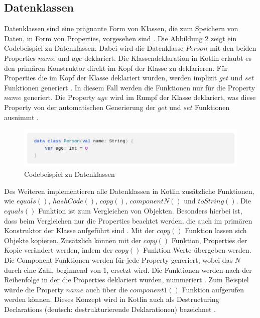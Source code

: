 \documentclass{article}
\begin{document}
\subsection{Datenklassen}
Datenklassen sind eine prägnante Form von Klassen, die zum Speichern von Daten, in Form von Properties, vorgesehen sind \cite{KotlinLangDoc}. Die Abbildung 2 zeigt ein Codebeispiel zu Datenklassen. Dabei wird die Datenklasse $Person$ mit den beiden Properties $name$ und $age$ deklariert. Die Klassendeklaration in Kotlin erlaubt es den primären Konstruktor direkt im Kopf der Klasse zu deklarieren. Für Properties die im Kopf der Klasse deklariert wurden, werden implizit $get$ und $set$ Funktionen generiert \cite{KotlinLangDoc}. In diesem Fall werden die Funktionen nur für die Property $name$ generiert. Die Property $age$ wird im Rumpf der Klasse deklariert, was diese Property von der automatischen Generierung der $get$ und $set$ Funktionen ausnimmt \cite{KotlinLangDoc}.
\begin{figure}[!htb]
    \centering
    \includegraphics[width=\linewidth]{img/Dataclass.png}
    \caption{Codebeispiel zu Datenklassen\footnotemark}
\end{figure}
\newline
Des Weiteren implementieren alle Datenklassen in Kotlin zusätzliche Funktionen, wie $equals()$, $hashCode()$, $copy()$, $componentN()$ und $toString()$. Die $equals()$ Funktion ist zum Vergleichen von Objekten. Besonders hierbei ist, dass beim Vergleichen nur die Properties beachtet werden, die auch im primären Konstruktor der Klasse aufgeführt sind \cite{KotlinLangDoc}. Mit der $copy()$ Funktion lassen sich Objekte kopieren. Zusätzlich können mit der $copy()$ Funktion, Properties der Kopie verändert werden, indem der $copy()$ Funktion Werte übergeben werden. Die Component Funktionen werden für jede Property generiert, wobei das $N$ durch eine Zahl, beginnend von 1, ersetzt wird. Die Funktionen werden nach der Reihenfolge in der die Properties deklariert wurden, nummeriert \cite{KotlinLangDoc}. Zum Beispiel würde die Property $name$ auch über die $component1()$ Funktion aufgerufen werden können. Dieses Konzept wird in Kotlin auch als Destructuring Declarations (deutsch: destrukturierende Deklarationen) bezeichnet \cite{KotlinLangDoc}.
\end{document}
